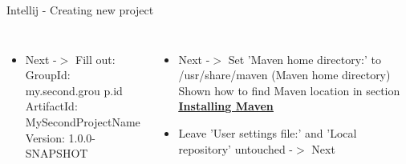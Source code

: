 \documentclass[aspectratio=1610,english]{beamer} %
\begin{document}
\begin{frame}{Intellij - Creating new project}
\begin{columns}
				\begin{minipage}{\textwidth}
				\end{minipage}
				
				\begin{itemize}
					\tiny
					\color{black}
					\item Next -$>$ Fill out: \\
					\fontsize{4}{5} \selectfont 
					\color{gray}
					GroupId: my.second.grou p.id \\
					ArtifactId: MySecondProjectName \\
					Version: 1.0.0-SNAPSHOT 
				\end{itemize}
				
				\begin{minipage}{\textwidth}
				\end{minipage}
				
				\begin{itemize}
					\tiny
					\color{black}
					\item Next -$>$ Set 'Maven home directory:' to \\ 
					\color{gray}
					/usr/share/maven (Maven home directory) \\ 
					\fontsize{3}{4} \selectfont 
					Shown how to find Maven location in section 
						\hyperlink{page.6}{\textbf{\underline{Installing Maven}}}
					\tiny \color{black}
					\item Leave 'User settings file:' and 'Local repository' untouched -$>$ Next 
				\end{itemize}


\end{columns}
\end{frame}
\end{document}
